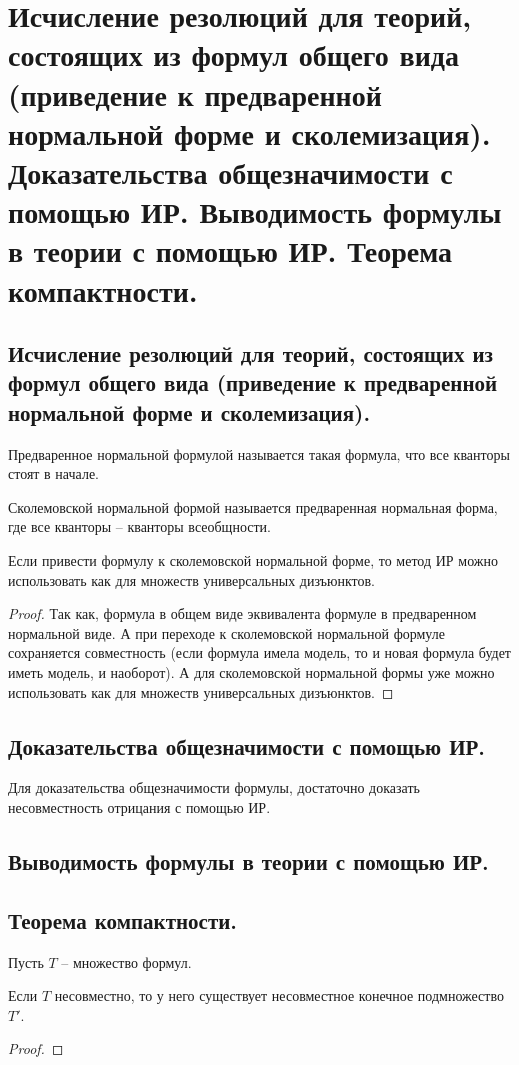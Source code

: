 \section{Исчисление резолюций для теорий, состоящих из формул общего вида (приведение к предваренной нормальной форме и сколемизация). Доказательства общезначимости с помощью ИР. Выводимость формулы в теории с помощью ИР. Теорема компактности.}

\subsection{Исчисление резолюций для теорий, состоящих из формул общего вида (приведение к предваренной нормальной форме и сколемизация).}

\begin{definition}
  Предваренное нормальной формулой называется такая формула, что все кванторы стоят в начале.
\end{definition}

\begin{definition}
  Сколемовской нормальной формой называется предваренная нормальная форма, где все кванторы -- кванторы всеобщности.
\end{definition}

\begin{statement}
  Если привести формулу к сколемовской нормальной форме, то метод ИР можно использовать как для множеств универсальных дизъюнктов.
  \begin{proof}
    Так как, формула в общем виде эквивалента формуле в предваренном нормальной виде. А при переходе к сколемовской нормальной формуле сохраняется совместность (если формула имела модель, то и новая формула будет иметь модель, и наоборот). А для сколемовской нормальной формы уже можно использовать как для множеств универсальных дизъюнктов.
  \end{proof}
\end{statement}

\subsection{Доказательства общезначимости с помощью ИР.}

Для доказательства общезначимости формулы, достаточно доказать несовместность отрицания с помощью ИР.

\subsection{Выводимость формулы в теории с помощью ИР.}

\subsection{Теорема компактности.}

Пусть $T$ -- множество формул.

\begin{theorem}
  Если $T$ несовместно, то у него существует несовместное конечное подмножество $T'$.
  \begin{proof}
    
  \end{proof}
\end{theorem}